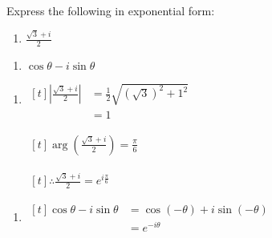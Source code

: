 \documentclass[11pt,a4paper]{book}
\begin{document}
\begin{example}

Express the following in exponential form:

\begin{minipage}[t]{0.5\textwidth}

\begin{enumerate}[label=(\alph*)]

\item  ${\displaystyle \frac{\sqrt{3}+i}{2}}$

\end{enumerate}

\end{minipage}
\begin{minipage}[t]{0.5\textwidth}

\begin{enumerate}[label=(\alph*),start=2]

\item  $\cos\theta-i\sin\theta$

\end{enumerate}

\end{minipage}

\medskip{}

\Solution

\begin{minipage}[t]{0.5\textwidth}

\begin{enumerate}[label=(\alph*)]

\item
$
\begin{aligned}[t]
\left|\frac{\sqrt{3}+i}{2}\right| & =\frac{1}{2}\sqrt{\left(\sqrt{3}\right)^{2}+1^{2}}\\
 & =1
\end{aligned}
$

$
\begin{aligned}[t]
\arg\left(\frac{\sqrt{3}+i}{2}\right)=\frac{\pi}{6}
\end{aligned}
$

$
\begin{aligned}[t]
\therefore\frac{\sqrt{3}+i}{2}=e^{i\frac{\pi}{6}}
\end{aligned}
$

\end{enumerate}

\end{minipage}
\begin{minipage}[t]{0.5\textwidth}

\begin{enumerate}[label=(\alph*),start=2]

\item
$
\begin{aligned}[t]
\cos\theta-i\sin\theta & =\cos\left(-\theta\right)+i\sin\left(-\theta\right)\\
 & =e^{-i\theta}
\end{aligned}
$

\end{enumerate}

\end{minipage}

\end{example}
\end{document}
